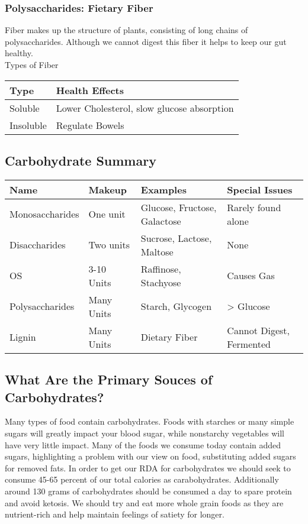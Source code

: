 \documentclass[letterpaper, 11pt]{article}
\begin{document}
\subsubsection{Polysaccharides: Fietary Fiber}
\label{sec:org5f772ac}
Fiber makes up the structure of plants, consisting of long chains of polysaccharides. Although we cannot digest this fiber it helps to keep our gut healthy.\\
Types of Fiber\\
\begin{center}
\begin{tabular}{ll}
Type & Health Effects\\
\hline
Soluble & Lower Cholesterol,  slow glucose absorption\\
Insoluble & Regulate Bowels\\
\end{tabular}
\end{center}
\subsection{Carbohydrate Summary}
\label{sec:org7e733a2}
\begin{center}
\begin{tabular}{llll}
Name & Makeup & Examples & Special Issues\\
\hline
Monosaccharides & One unit & Glucose, Fructose, Galactose & Rarely found alone\\
Disaccharides & Two units & Sucrose, Lactose, Maltose & None\\
OS & 3-10 Units & Raffinose, Stachyose & Causes Gas\\
Polysaccharides & Many Units & Starch, Glycogen & > Glucose\\
Lignin & Many Units & Dietary Fiber & Cannot Digest, Fermented\\
\end{tabular}
\end{center}
\subsection{What Are the Primary Souces of Carbohydrates?}
\label{sec:orge8574a1}
Many types of food contain carbohydrates. Foods with starches or many simple sugars will greatly impact your blood sugar, while nonstarchy vegetables will have very little impact. Many of the foods we consume today contain added sugars, highlighting a problem with our view on food, substituting added sugars for removed fats. In order to get our RDA for carbohydrates we should seek to consume 45-65 percent of our total calories as carabohydrates. Additionally around 130 grams of carbohydrates should be consumed a day to spare protein and avoid ketosis. We should try and eat more whole grain foods as they are nutrient-rich and help maintain feelings of satiety for longer.\\
\end{document}
